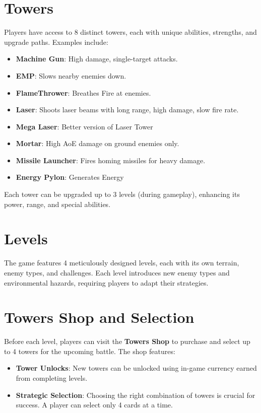 \documentclass[12pt,a4paper]{report}
\begin{document}
\section{Towers}
Players have access to 8 distinct towers, each with unique abilities, strengths, and upgrade paths. Examples include:  
\begin{itemize}
    \item \textbf{Machine Gun}: High damage, single-target attacks.  
    \item \textbf{EMP}: Slows nearby enemies down.
    \item \textbf{FlameThrower}:  Breathes Fire at enemies.
    \item \textbf{Laser}: Shoots laser beams with long range, high damage, slow fire rate. 
    \item \textbf{Mega Laser}: Better version of Laser Tower  
    \item \textbf{Mortar}: High AoE damage on ground enemies only. 
    \item \textbf{Missile Launcher}: Fires homing missiles for heavy damage.  
    \item \textbf{Energy Pylon}: Generates Energy 
\end{itemize}

Each tower can be upgraded up to 3 levels (during gameplay), enhancing its power, range, and special abilities.

\section{Levels}  
The game features 4 meticulously designed levels, each with its own terrain, enemy types, and challenges.  
Each level introduces new enemy types and environmental hazards, requiring players to adapt their strategies.

\section{Towers Shop and Selection}  
Before each level, players can visit the \textbf{Towers Shop} to purchase and select up to 4 towers for the upcoming battle. The shop features:  
\begin{itemize}
    \item \textbf{Tower Unlocks}: New towers can be unlocked using in-game currency earned from completing levels.  
    \item \textbf{Strategic Selection}: Choosing the right combination of towers is crucial for success. A player can select only 4 cards at a time.  
\end{itemize}
\end{document}
